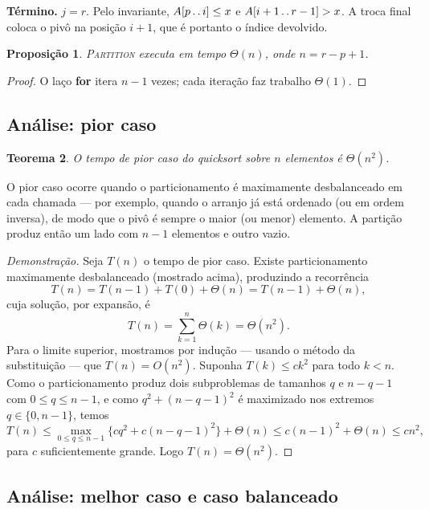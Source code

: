 \documentclass[9pt,a4paper]{extarticle}
\newcommand{\impt}[1]{\textcolor{important}{#1}}
\newtheorem{theorem}{Teorema}[section]
\newtheorem{proposition}[theorem]{Proposição}
\theoremstyle{definition}
\begin{document}
\textbf{Término.} $j = r$. Pelo invariante, $A[p\mathinner{.\,.} i] \le x$ e
$A[i+1\mathinner{.\,.} r-1] > x$. A troca final coloca o pivô na posição $i+1$, que
é portanto o índice devolvido.

\begin{proposition}
\textsc{Partition} executa em tempo $\Theta(n)$, onde $n = r - p + 1$.
\end{proposition}

\begin{proof}
O laço \textbf{for} itera $n - 1$ vezes; cada iteração faz trabalho
$\Theta(1)$.
\end{proof}

\subsection{Análise: pior caso}

\begin{theorem}\label{teo:qsort-pior}
O tempo de pior caso do quicksort sobre $n$ elementos é $\Theta(n^2)$.
\end{theorem}

O pior caso ocorre quando o particionamento é \impt{maximamente
desbalanceado} em cada chamada --- por exemplo, quando o arranjo já está
ordenado (ou em ordem inversa), de modo que o pivô é sempre o maior (ou
menor) elemento. A partição produz então um lado com $n-1$ elementos e
outro vazio.

\begin{proof}[Demonstração]
Seja $T(n)$ o tempo de pior caso. Existe particionamento maximamente
desbalanceado (mostrado acima), produzindo a recorrência
\[
  T(n) = T(n-1) + T(0) + \Theta(n) = T(n-1) + \Theta(n),
\]
cuja solução, por expansão, é
\[
  T(n) = \sum_{k=1}^{n} \Theta(k) = \Theta(n^2).
\]
Para o limite superior, mostramos por indução --- usando o método da
substituição --- que $T(n) = O(n^2)$. Suponha $T(k) \le c k^2$ para todo
$k < n$. Como o particionamento produz dois subproblemas de tamanhos
$q$ e $n - q - 1$ com $0 \le q \le n-1$, e como $q^2 + (n-q-1)^2$ é
maximizado nos extremos $q \in \{0, n-1\}$, temos
\[
  T(n) \le \max_{0 \le q \le n-1}\{ c q^2 + c(n-q-1)^2 \} + \Theta(n)
       \le c(n-1)^2 + \Theta(n)
       \le c n^2,
\]
para $c$ suficientemente grande. Logo $T(n) = \Theta(n^2)$.
\end{proof}

\subsection{Análise: melhor caso e caso balanceado}
\end{document}
